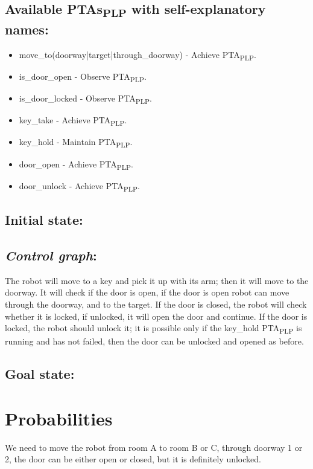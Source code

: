 \subsection{Available PTAs\textsubscript{PLP} with self-explanatory names:}
\begin{itemize}
\item move_to(doorway|target|through_doorway) - Achieve PTA\textsubscript{PLP}.
\item is_door_open - Observe PTA\textsubscript{PLP}.
\item is_door_locked - Observe PTA\textsubscript{PLP}.
\item key_take - Achieve PTA\textsubscript{PLP}.
\item key_hold - Maintain PTA\textsubscript{PLP}.
\item door_open - Achieve PTA\textsubscript{PLP}.
\item door_unlock - Achieve PTA\textsubscript{PLP}.
\end{itemize}
\subsection{Initial state: }
 \clearpage
\subsection{\textit{Control graph}:}
The robot will move to a key and pick it up with its arm; then it will move to the doorway. It will check if the door is open, if the door is open robot can move through the doorway, and to the target. If the door is closed, the robot will check whether it is locked, if unlocked, it will open the door and continue. If the door is locked, the robot should unlock it; it is possible only if the key_hold PTA\textsubscript{PLP} is running and has not failed, then the door can be unlocked and opened as before.  \subsection{Goal state: }
 \section{Probabilities}
We need to move the robot from room A to room B or C, through doorway 1 or 2, the door can be either open or closed, but it is definitely unlocked. \\
